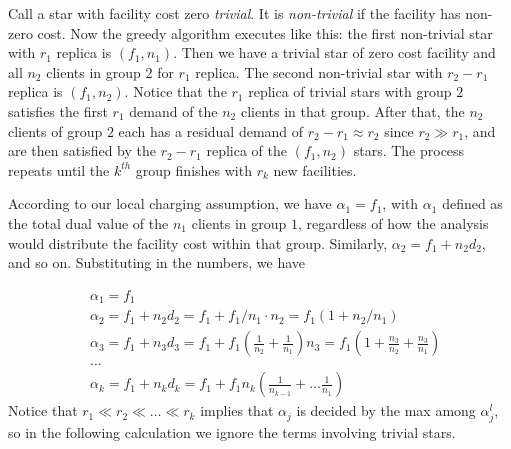 \documentclass[oneside,final]{ucr}
\begin{document}
Call a star with facility cost zero \emph{trivial}. It is
\emph{non-trivial} if the facility has non-zero cost. Now
the greedy algorithm executes like this: the first
non-trivial star with $r_1$ replica is $(f_1, n_1)$. Then we
have a trivial star of zero cost facility and all $n_2$
clients in group $2$ for $r_1$ replica. The second
non-trivial star with $r_2 - r_1$ replica is $(f_1,
n_2)$. Notice that the $r_1$ replica of trivial stars with
group $2$ satisfies the first $r_1$ demand of the $n_2$
clients in that group. After that, the $n_2$ clients of
group $2$ each has a residual demand of $r_2 - r_1 \approx
r_2$ since $r_2 \gg r_1$, and are then satisfied by the $r_2
- r_1$ replica of the $(f_1, n_2)$ stars. The process
repeats until the $k^{th}$ group finishes with $r_k$ new
facilities.

According to our local charging assumption, we have
$\alpha_1 = f_1$, with $\alpha_1$ defined as the total dual
value of the $n_1$ clients in group $1$, regardless of how
the analysis would distribute the facility cost within that
group. Similarly, $\alpha_2 = f_1 + n_2 d_2$, and so
on. Substituting in the numbers, we have

\begin{align*}
  &\alpha_1 = f_1\\
  &\alpha_2 = f_1 + n_2 d_2 = f_1 + f_1/n_1\cdot n_2 = f_1 (1 + n_2 /
  n_1)\\
  &\alpha_3 = f_1 + n_3 d_3 = f_1 + f_1 (\frac{1}{n_2} +
  \frac{1}{n_1}) n_3 = f_1 (1 + \frac{n_3}{n_2} + \frac{n_3}{n_1})\\
  &\ldots\\
  &\alpha_k = f_1 + n_k d_k = f_1 + f_1 n_k (\frac{1}{n_{k-1}} + \ldots
  \frac{1}{n_1})
\end{align*}
Notice that $r_1 \ll r_2 \ll \ldots \ll r_k$ implies that
$\alpha_j$ is decided by the max among $\alpha_j^l$, so in
the following calculation we ignore the terms involving
trivial stars.
\end{document}
